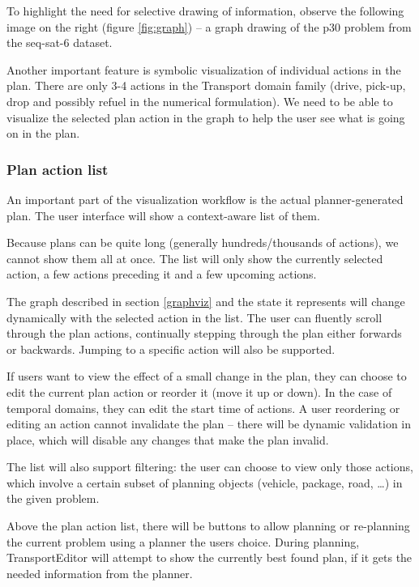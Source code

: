 \documentclass[10pt,a4paper,oneside]{article}
\newcommand{\pname}{TransportEditor} %
\begin{document}
To highlight the need for selective drawing of information, observe the following image on the right (figure \ref{fig:graph}) -- a graph drawing of the p30 problem from the seq-sat-6 dataset.

Another important feature is symbolic visualization of individual actions in the plan.
There are only 3-4 actions in the Transport domain family (drive, pick-up, drop and possibly refuel in the numerical formulation).
We need to be able to visualize the selected plan action in the graph to help the user see what is going on in the plan.

\subsubsection{Plan action list} \label{plan-action-list}

An important part of the visualization workflow is the actual planner-generated plan.
The user interface will show a context-aware list of them.

Because plans can be quite long (generally hundreds/thousands of actions),
we cannot show them all at once.
The list will only show the currently selected action, a few actions preceding it and a few upcoming actions.

The graph described in section \ref{graphviz} and the state it represents will change dynamically with the selected action in the list. The user can fluently scroll through the plan actions, continually stepping through the plan either forwards or backwards.
Jumping to a specific action will also be supported.

If users want to view the effect of a small change in the plan, they can choose to edit the current plan action or reorder it (move it up or down).
In the case of temporal domains, they can edit the start time of actions.
A user reordering or editing an action cannot invalidate the plan -- there will be dynamic validation in place, which will disable any changes that make the plan invalid.

The list will also support filtering: the user can choose to view only those actions, which involve a certain subset of planning objects (vehicle, package, road, \ldots) in the given problem.

Above the plan action list, there will be buttons to allow planning or re-planning the current problem using a planner the users choice.
During planning, \pname{} will attempt to show the currently best found plan, if it gets the needed information from the planner.
\end{document}
